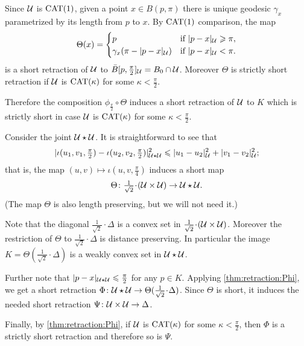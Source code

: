 \documentclass[oneside,a4paper, 12pt]{article}
\begin{document}
Since ${\mathcal{U}}$ is $\mathrm{CAT}(1)$,
given a point $x\in B(p,\pi)$ there is unique geodesic $\gamma_x$ parametrized by its length from $p$ to $x$. 
By $\mathrm{CAT}(1)$ comparison, the map 
\[\Theta(x)=
\begin{cases}
p&\text{if\ }|p-x|_{\mathcal{U}}\geqslant \pi,
\\
\gamma_x(\pi-|p-x|_{\mathcal{U}})&\text{if\ }|p-x|_{\mathcal{U}}< \pi.
\end{cases}
\]
is a short retraction of ${\mathcal{U}}$ to $\bar B[p,\tfrac\pi2]_{\mathcal{U}}=B_0\cap \mathcal{U}$.
Moreover $\Theta$ is strictly short retraction if $\mathcal{U}$ is $\mathrm{CAT}(\kappa)$ for some $\kappa<\tfrac\pi2$.

Therefore the composition $\phi_{\frac\pi2}\circ\Theta$ induces a short retraction of ${\mathcal{U}}$ to $K$
which is strictly short in case $\mathcal{U}$ is $\mathrm{CAT}(\kappa)$ for some $\kappa<\tfrac\pi2$.
\qeds


Consider the joint $\mathcal{U}\star\mathcal{U}$.
It is straightforward to see that 
\[|\iota(u_1,v_1,\tfrac\pi2)-\iota(u_2,v_2,\tfrac\pi2)|^2_{\mathcal{U}\star\mathcal{U}}\leqslant |u_1-u_2|^2_{\mathcal{U}}+|v_1-v_2|_{\mathcal{U}}^2;\]
that is, the map $(u,v)\mapsto \iota(u,v,\tfrac\pi4)$ induces a short map 
\[\Theta\:{\tfrac1{\sqrt{2}}}\cdot(\spc{U}\times\spc{U})\to\spc{U}\star\spc{U}.\]
(The map $\Theta$ is also length preserving, but we will not need it.)

Note that the diagonal $\tfrac1{\sqrt{2}}\cdot\Delta$ is a convex set in $\tfrac1{\sqrt{2}}\cdot(\spc{U}\times\spc{U})$.
Moreover the restriction of $\Theta$ to $\tfrac1{\sqrt{2}}\cdot\Delta$ is distance preserving.
In particular the image $K=\Theta(\tfrac1{\sqrt{2}}\cdot\Delta)$ is a weakly convex set in $\mathcal{U}\star\mathcal{U}$.

Further note that $|p-x|_{\mathcal{U}\star\mathcal{U}}\leqslant \tfrac\pi2$ for any $p\in K$.
Applying \ref{thm:retraction:Phi}, we get a short retraction $\Phi\:\spc{U}\star\spc{U}\to \Theta(\tfrac1{\sqrt{2}}\cdot\Delta)$.
Since $\Theta$ is short, it induces the needed short retraction $\Psi\colon\mathcal{U}\times\mathcal{U}\to \Delta$.

Finally, by \ref{thm:retraction:Phi}, if $\mathcal{U}$ is $\mathrm{CAT}(\kappa)$ for some $\kappa<\tfrac\pi2$, then $\Phi$ is a strictly short retraction and therefore so is $\Psi$.
\qeds





{\small\sloppy

\printbibliography[heading=bibintoc]

}
\end{document}
